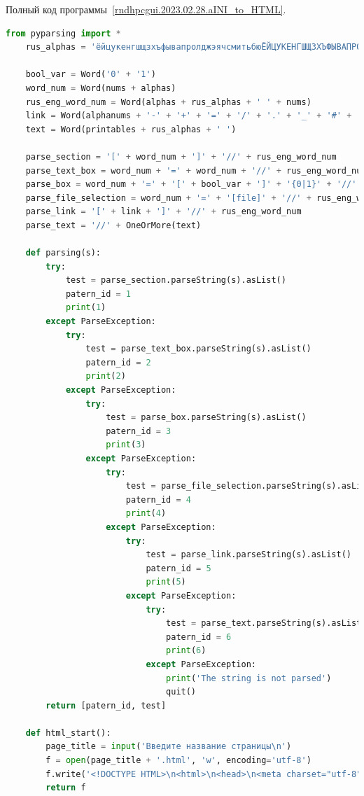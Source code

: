 Полный код программы~\ref{rndhpcgui.2023.02.28.aINI_to_HTML}.
\begin{lstlisting}[frame=single, label={rndhpcgui.2023.02.28.aINI_to_HTML}, caption={Пример выходных данных}, language={Python}]
    from pyparsing import *
    rus_alphas = 'ёйцукенгшщзхъфывапролджэячсмитьбюЁЙЦУКЕНГШЩЗХЪФЫВАПРОЛДЖЭЯЧСМИТЬБЮ'

    bool_var = Word('0' + '1')
    word_num = Word(nums + alphas)
    rus_eng_word_num = Word(alphas + rus_alphas + ' ' + nums)
    link = Word(alphanums + '-' + '+' + '=' + '/' + '.' + '_' + '#' + ':' + '&' + '?' + '%')
    text = Word(printables + rus_alphas + ' ')

    parse_section = '[' + word_num + ']' + '//' + rus_eng_word_num
    parse_text_box = word_num + '=' + word_num + '//' + rus_eng_word_num
    parse_box = word_num + '=' + '[' + bool_var + ']' + '{0|1}' + '//' + rus_eng_word_num
    parse_file_selection = word_num + '=' + '[file]' + '//' + rus_eng_word_num
    parse_link = '[' + link + ']' + '//' + rus_eng_word_num
    parse_text = '//' + OneOrMore(text)

    def parsing(s):
        try:
            test = parse_section.parseString(s).asList()
            patern_id = 1
            print(1)
        except ParseException:
            try:
                test = parse_text_box.parseString(s).asList()
                patern_id = 2
                print(2)
            except ParseException:
                try:
                    test = parse_box.parseString(s).asList()
                    patern_id = 3
                    print(3)
                except ParseException:
                    try:
                        test = parse_file_selection.parseString(s).asList()
                        patern_id = 4
                        print(4)
                    except ParseException:
                        try:
                            test = parse_link.parseString(s).asList()
                            patern_id = 5
                            print(5)
                        except ParseException:
                            try:
                                test = parse_text.parseString(s).asList()
                                patern_id = 6
                                print(6)
                            except ParseException:
                                print('The string is not parsed')
                                quit()
        return [patern_id, test]

    def html_start():
        page_title = input('Введите название страницы\n')
        f = open(page_title + '.html', 'w', encoding='utf-8')
        f.write('<!DOCTYPE HTML>\n<html>\n<head>\n<meta charset="utf-8">\n<title>'+page_title+'</title>\n<style>\np.text {text-indent: 20px;}\n</style>\n</head>\n<body>\n<form enctype="multipart/form-data" method="post">\n')
        return f


\end{lstlisting}
